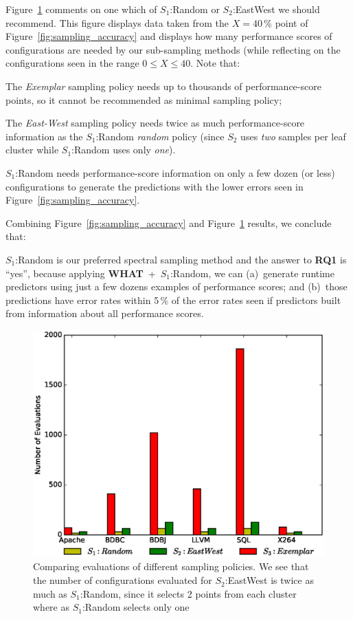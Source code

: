\documentclass{sig-alternative}
\newcommand{\fig}[1]{Figure~\ref{fig:#1}}
\newcommand{\what}{{\bf WHAT }}
\begin{document}
\fig{Evaluations} comments on one which  of    $S_1$:Random or $S_2$:EastWest we should recommend.
This figure displays data taken from the $X=40$\,\% point of \fig{sampling_accuracy} and displays
how many performance scores of configurations are needed by our sub-sampling methods (while
reflecting on the configurations seen in the range $0\le X \le 40$. Note that:
\begin{compactitem}
\item
The {\em Exemplar} sampling policy needs up to thousands of performance-score points, 
so it cannot be recommended as minimal sampling policy;
\item The {\em East-West} sampling policy needs twice as much performance-score information as 
the $S_1$:Random {\em random} policy (since $S_2$ uses {\em two} samples per leaf cluster  while
$S_1$:Random uses only {\em one}).
\item $S_1$:Random needs performance-score information on only a few dozen (or less) configurations to generate
the predictions with the lower errors seen in \fig{sampling_accuracy}.
\end{compactitem}
Combining \fig{sampling_accuracy} and \fig{Evaluations} results, we conclude that:

\begin{myshadowbox}
$S_1$:Random is our preferred spectral sampling method and
the answer to {\bf RQ1} is ``yes'', because applying \mbox{\what + $S_1$:Random}, we can (a)~generate runtime predictors
using just a few dozens examples of performance scores; and (b)~those predictions have error rates
within 5\,\% of the error rates seen if predictors built from information about all performance scores.
\end{myshadowbox}

\begin{figure}[!t]
\includegraphics[width=0.9\linewidth]{Figures/evaluation_graph.eps}
\caption{ Comparing evaluations of different sampling policies. We see that the number of configurations evaluated for $S_2$:EastWest is twice as much as $S_1$:Random, since it selects 2 points from each cluster where as  $S_1$:Random selects only one }\label{fig:Evaluations}
\end{figure}
\end{document}
